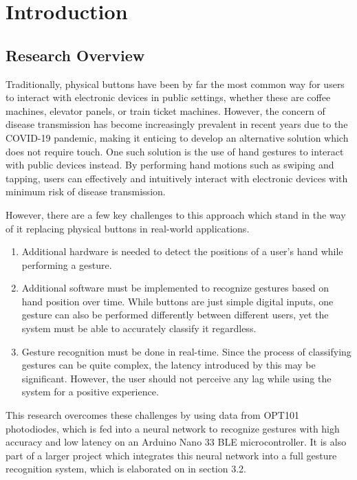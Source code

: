 \setlength{\parskip}{\baselineskip}%
\setlength{\parindent}{0pt}%

\section{Introduction}\label{sec:introduction}
\subsection{Research Overview}\label{subsec:research-overview}
Traditionally, physical buttons have been by far the most common way for users to interact with electronic devices in public settings, whether these are coffee machines, elevator panels, or train ticket machines.
However, the concern of disease transmission has become increasingly prevalent in recent years due to the COVID-19 pandemic, making it enticing to develop an alternative solution which does not require touch.
One such solution is the use of hand gestures to interact with public devices instead.
By performing hand motions such as swiping and tapping, users can effectively and intuitively interact with electronic devices with minimum risk of disease transmission.

However, there are a few key challenges to this approach which stand in the way of it replacing physical buttons in real-world applications.
\begin{enumerate}
    \item Additional hardware is needed to detect the positions of a user's hand while performing a gesture.
    \item Additional software must be implemented to recognize gestures based on hand position over time.
    While buttons are just simple digital inputs, one gesture can also be performed differently between different users, yet the system must be able to accurately classify it regardless.
    \item Gesture recognition must be done in real-time.
    Since the process of classifying gestures can be quite complex, the latency introduced by this may be significant.
    However, the user should not perceive any lag while using the system for a positive experience.
\end{enumerate}

This research overcomes these challenges by using data from OPT101 photodiodes, which is fed into a neural network to recognize gestures with high accuracy and low latency on an Arduino Nano 33 BLE microcontroller.
It is also part of a larger project which integrates this neural network into a full gesture recognition system, which is elaborated on in section 3.2.

